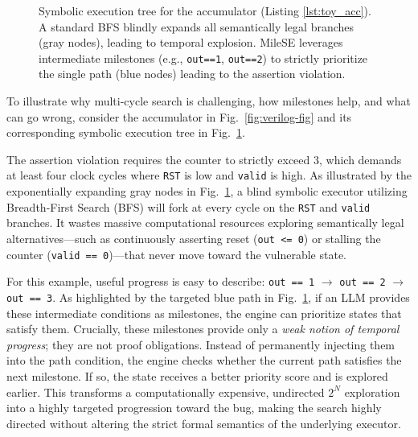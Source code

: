 \documentclass[conference]{IEEEtran}
\begin{document}
\begin{figure}[htbp]
{%
    }
    \caption{Symbolic execution tree for the accumulator (Listing \ref{lst:toy_acc}). A standard BFS blindly expands all semantically legal branches (gray nodes), leading to temporal explosion. MileSE leverages intermediate milestones (e.g., \texttt{out==1}, \texttt{out==2}) to strictly prioritize the single path (blue nodes) leading to the assertion violation.}
    \label{fig:sym_tree}
\end{figure}

To illustrate why multi-cycle search is challenging, how milestones help, and what can go wrong, consider the accumulator in Fig.~\ref{fig:verilog-fig} and its corresponding symbolic execution tree in Fig.~\ref{fig:sym_tree}.

The assertion violation requires the counter to strictly exceed 3, which demands at least four clock cycles where \texttt{RST} is low and \texttt{valid} is high. As illustrated by the exponentially expanding gray nodes in Fig.~\ref{fig:sym_tree}, a blind symbolic executor utilizing Breadth-First Search (BFS) will fork at every cycle on the \texttt{RST} and \texttt{valid} branches. It wastes massive computational resources exploring semantically legal alternatives---such as continuously asserting reset (\texttt{out <= 0}) or stalling the counter (\texttt{valid == 0})---that never move toward the vulnerable state. 

For this example, useful progress is easy to describe: \texttt{out == 1} $\rightarrow$ \texttt{out == 2} $\rightarrow$ \texttt{out == 3}. As highlighted by the targeted blue path in Fig.~\ref{fig:sym_tree}, if an LLM provides these intermediate conditions as milestones, the engine can prioritize states that satisfy them. Crucially, these milestones provide only a \textit{weak notion of temporal progress}; they are not proof obligations. Instead of permanently injecting them into the path condition, the engine checks whether the current path satisfies the next milestone. If so, the state receives a better priority score and is explored earlier. This transforms a computationally expensive, undirected $2^N$ exploration into a highly targeted progression toward the bug, making the search highly directed without altering the strict formal semantics of the underlying executor.
\end{document}
